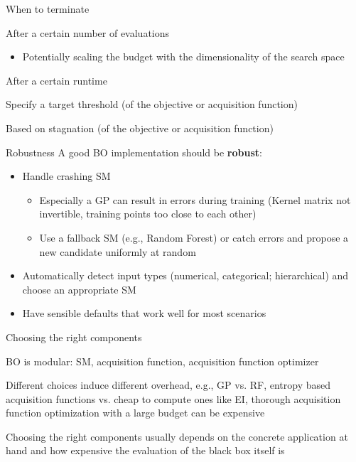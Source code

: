 \documentclass[11pt,compress,t,notes=noshow, xcolor=table]{beamer}
\begin{document}
\begin{framei}{When to terminate}
\item After a certain number of evaluations
\begin{itemize}
\item Potentially scaling the budget with the dimensionality of the search space
\end{itemize}
\item After a certain runtime
\item Specify a target threshold (of the objective or acquisition function)
\item Based on stagnation (of the objective or acquisition function)
\end{framei}


\begin{framev}{Robustness}
A good BO implementation should be \textbf{robust}:
\spacer
\begin{itemize}
\item Handle crashing SM
\begin{itemize}
\item Especially a GP can result in errors during training (Kernel matrix not invertible, training points too close to each other)
\item Use a fallback SM (e.g., Random Forest) or catch errors and propose a new candidate uniformly at random
\end{itemize}
\item Automatically detect input types (numerical, categorical; hierarchical) and choose an appropriate SM
\item Have sensible defaults that work well for most scenarios
\end{itemize}
\end{framev}


\begin{framei}{Choosing the right components}
\item BO is modular: SM, acquisition function, acquisition function optimizer
\item Different choices induce different overhead, e.g., GP vs. RF, entropy based acquisition functions vs. cheap to compute ones like EI, thorough acquisition function optimization with a large budget can be expensive
\item Choosing the right components usually depends on the concrete application at hand and how expensive the evaluation of the black box itself is
\end{framei}

\endlecture
\end{document}
